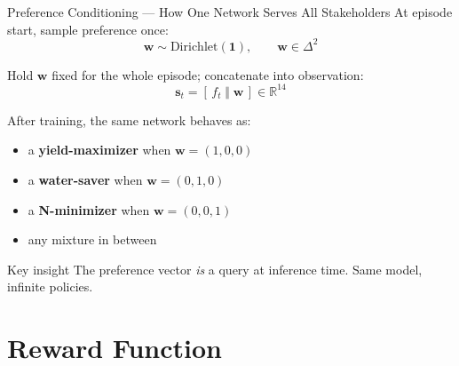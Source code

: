 \documentclass[10pt,aspectratio=169]{beamer}
\newcommand{\R}{\mathbb{R}}
\newcommand{\wvec}{\mathbf{w}}
\newcommand{\sten}{\mathbf{s}}
\begin{document}
\begin{frame}{Preference Conditioning --- How One Network Serves All Stakeholders}
  At episode start, sample preference once:
  \[
    \wvec \sim \mathrm{Dirichlet}(\mathbf{1}), \qquad \wvec \in \Delta^2
  \]

  Hold $\wvec$ fixed for the whole episode; concatenate into observation:
  \[
    \sten_t = [\,f_t \;\Vert\; \wvec\,] \in \R^{14}
  \]

  \vspace{0.5em}
  After training, the same network behaves as:
  \begin{itemize}
    \item a \textcolor{cYield}{\textbf{yield-maximizer}} when $\wvec = (1, 0, 0)$
    \item a \textcolor{cWater}{\textbf{water-saver}} when $\wvec = (0, 1, 0)$
    \item a \textcolor{cFert}{\textbf{N-minimizer}} when $\wvec = (0, 0, 1)$
    \item any mixture in between
  \end{itemize}

  \vspace{0.5em}
  \begin{block}{Key insight}
  The preference vector \emph{is} a query at inference time. Same model, infinite policies.
  \end{block}
\end{frame}

\section{Reward Function}
\end{document}
